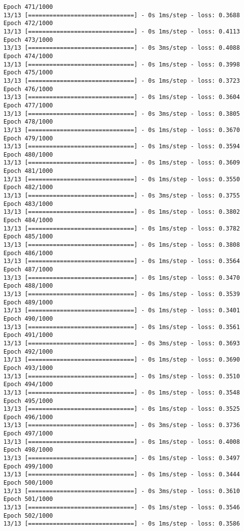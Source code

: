 \documentclass[11pt]{article}
\begin{document}
\begin{Verbatim}[commandchars=\\\{\}]
Epoch 471/1000
13/13 [==============================] - 0s 1ms/step - loss: 0.3688
Epoch 472/1000
13/13 [==============================] - 0s 1ms/step - loss: 0.4113
Epoch 473/1000
13/13 [==============================] - 0s 3ms/step - loss: 0.4088
Epoch 474/1000
13/13 [==============================] - 0s 1ms/step - loss: 0.3998
Epoch 475/1000
13/13 [==============================] - 0s 1ms/step - loss: 0.3723
Epoch 476/1000
13/13 [==============================] - 0s 1ms/step - loss: 0.3604
Epoch 477/1000
13/13 [==============================] - 0s 3ms/step - loss: 0.3805
Epoch 478/1000
13/13 [==============================] - 0s 1ms/step - loss: 0.3670
Epoch 479/1000
13/13 [==============================] - 0s 1ms/step - loss: 0.3594
Epoch 480/1000
13/13 [==============================] - 0s 1ms/step - loss: 0.3609
Epoch 481/1000
13/13 [==============================] - 0s 1ms/step - loss: 0.3550
Epoch 482/1000
13/13 [==============================] - 0s 3ms/step - loss: 0.3755
Epoch 483/1000
13/13 [==============================] - 0s 1ms/step - loss: 0.3802
Epoch 484/1000
13/13 [==============================] - 0s 1ms/step - loss: 0.3782
Epoch 485/1000
13/13 [==============================] - 0s 1ms/step - loss: 0.3808
Epoch 486/1000
13/13 [==============================] - 0s 1ms/step - loss: 0.3564
Epoch 487/1000
13/13 [==============================] - 0s 1ms/step - loss: 0.3470
Epoch 488/1000
13/13 [==============================] - 0s 1ms/step - loss: 0.3539
Epoch 489/1000
13/13 [==============================] - 0s 1ms/step - loss: 0.3401
Epoch 490/1000
13/13 [==============================] - 0s 1ms/step - loss: 0.3561
Epoch 491/1000
13/13 [==============================] - 0s 3ms/step - loss: 0.3693
Epoch 492/1000
13/13 [==============================] - 0s 1ms/step - loss: 0.3690
Epoch 493/1000
13/13 [==============================] - 0s 1ms/step - loss: 0.3510
Epoch 494/1000
13/13 [==============================] - 0s 1ms/step - loss: 0.3548
Epoch 495/1000
13/13 [==============================] - 0s 1ms/step - loss: 0.3525
Epoch 496/1000
13/13 [==============================] - 0s 3ms/step - loss: 0.3736
Epoch 497/1000
13/13 [==============================] - 0s 1ms/step - loss: 0.4008
Epoch 498/1000
13/13 [==============================] - 0s 1ms/step - loss: 0.3497
Epoch 499/1000
13/13 [==============================] - 0s 1ms/step - loss: 0.3444
Epoch 500/1000
13/13 [==============================] - 0s 3ms/step - loss: 0.3610
Epoch 501/1000
13/13 [==============================] - 0s 1ms/step - loss: 0.3546
Epoch 502/1000
13/13 [==============================] - 0s 1ms/step - loss: 0.3586

\end{Verbatim}
\end{document}
